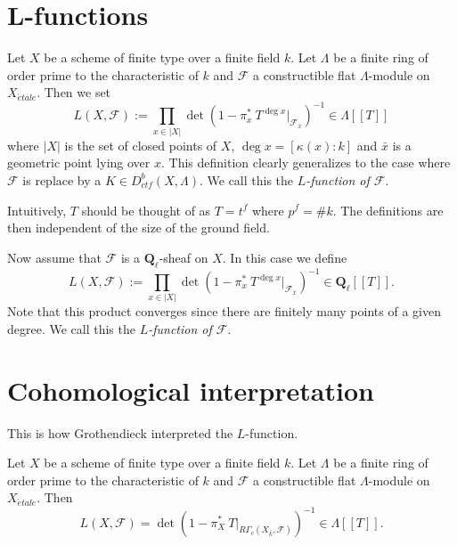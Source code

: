 \section{L-functions}
\label{section-L-function}

\begin{definition}
\label{definition-L-function-finite-ring}
Let $X$ be a scheme of finite type over a finite field $k$. Let $\Lambda$ be a
finite ring of order prime to the characteristic of $k$ and $\mathcal{F}$ a
constructible flat $\Lambda$-module on $X_{\acute{e}tale}$. Then we set
$$
L(X, \mathcal{F}) := \prod_{x\in |X|}\det\left(1-\pi_x^*\ T^{\deg
x}\Big|_{\mathcal{F}_{\bar x}}\right)^{-1}\in \Lambda [[ T ]]
$$
where $|X|$ is the set of closed points of $X$, $\deg x = [\kappa(x): k]$ and
$\bar x$ is a geometric point lying over $x$. This definition clearly
generalizes to the case where $\mathcal{F}$ is replace by a
$K \in D_{ctf}^b(X, \Lambda)$. We call this the {\it $L$-function of
$\mathcal{F}$}.
\end{definition}

\begin{remark}
\label{remark-T}
Intuitively, $T$ should be thought of as $T = t^f$ where $p^f = \# k$. The
definitions are then independent of the size of the ground field.
\end{remark}

\begin{definition}
\label{definition-L-function-l-adic}
Now assume that $\mathcal{F}$ is a $\mathbf{Q}_\ell$-sheaf on $X$.
In this case we define
$$
L(X, \mathcal{F}) := \prod_{x\in |X|}\det\left(1-\pi_x^*\ T^{\deg
x}\Big|_{\mathcal{F}_{\bar x}}\right)^{-1}\in \mathbf{Q}_\ell [[ T ]].
$$
Note that this product converges since there are finitely many points of a
given degree. We call this the {\it $L$-function of
$\mathcal{F}$}.
\end{definition}




\section{Cohomological interpretation}
\label{section-L-cohomological}

\noindent
This is how Grothendieck interpreted the $L$-function.

\begin{theorem}
\label{theorem-A}
Let $X$ be a scheme of finite type over a finite field $k$. Let $\Lambda$ be a
finite ring of order prime to the characteristic of $k$ and $\mathcal{F}$ a
constructible flat $\Lambda$-module on $X_{\acute{e}tale}$. Then
$$
L(X, \mathcal{F}) = \det\left(1-\pi_X^*\ T\Big|_{R\Gamma_c(X_{\bar k},
\mathcal{F})}\right)^{-1}\in \Lambda[[ T]].
$$
\end{theorem}

